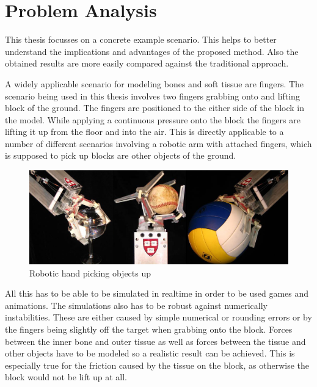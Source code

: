 \chapter{Problem Analysis}
\label{cha:problem_analysis}

This thesis focusses on a concrete example scenario. This helps to better understand the implications and advantages of the proposed method. Also the obtained results are more easily compared against the traditional approach.

A widely applicable scenario for modeling bones and soft tissue are fingers. The scenario being used in this thesis involves two fingers grabbing onto and lifting block of the ground. The fingers are positioned to the either side of the block in the model. While applying a continuous pressure onto the block the fingers are lifting it up from the floor and into the air. This is directly applicable to a number of different scenarios involving a robotic arm with attached fingers, which is supposed to pick up blocks are other objects of the ground.

\begin{figure}[htb]
\centering
\includegraphics[width=.96\textwidth]{images/robot_grabbing.png}
\caption{Robotic hand picking objects up\protect\footnotemark}
\label{img:robot_grabbing}
\end{figure}

All this has to be able to be simulated in realtime in order to be used games and animations. The simulations also has to be robust against numerically instabilities. These are either caused by simple numerical or rounding errors or by the fingers being slightly off the target when grabbing onto the block. Forces between the inner bone and outer tissue as well as forces between the tissue and other objects have to be modeled so a realistic result can be achieved. This is especially true for the friction caused by the tissue on the block, as otherwise the block would not be lift up at all.

